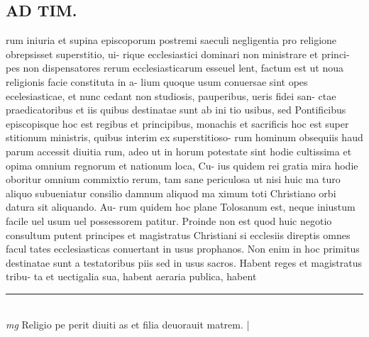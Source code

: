 \documentclass{article}
\begin{document}
\begin{pages}
\section*{AD TIM. }
\marginpar{[ p.157 ]}\pstart rum iniuria et supina episcoporum postremi saeculi negligentia pro religione obrepsisset superstitio, ui- rique ecclesiastici dominari non ministrare et princi- pes non dispensatores rerum ecclesiasticarum esseuel lent, factum est ut noua religionis facie constituta in a- lium quoque usum conuersae sint opes ecelesiasticae, et nunc cedant non studiosis, pauperibus, ueris fidei san- ctae praedicatoribus et iis quibus destinatae sunt ab ini tio usibus, sed Pontificibus episcopisque hoc est regibus et principibus, monachis et sacrificis hoc est super stitionum ministris, quibus interim ex superstitioso- rum hominum obsequiis haud parum accessit diuitia rum, adeo ut in horum potestate sint hodie cultissima et opima omnium regnorum et nationum loca, Cu- ius quidem rei gratia mira hodie oboritur omnium commixtio rerum, tam sane periculosa ut nisi huic ma turo aliquo subueniatur consilio damnum aliquod ma ximum toti Christiano orbi datura sit aliquando. Au- rum quidem hoc plane Tolosanum est, neque iniustum facile uel usum uel possessorem patitur. Proinde non est quod huic negotio consultum putent principes et magistratus Christiani si ecclesiis direptis omnes facul tates ecclesiasticas conuertant in usus prophanos. Non enim in hoc primitus destinatae sunt a testatoribus piis sed in usus sacros. Habent reges et magistratus tribu- ta et uectigalia sua, habent aeraria publica, habent  \pend
\vspace{0.5cm}\noindent
\vspace{0.2cm}\rule{1cm}{0.2pt}\\ 
\hspace{0.2cm}\textit{mg}
\footnotesize Religio pe perit diuiti as et filia deuorauit matrem. 
\normalsize| 

\end{pages}
\end{document}
